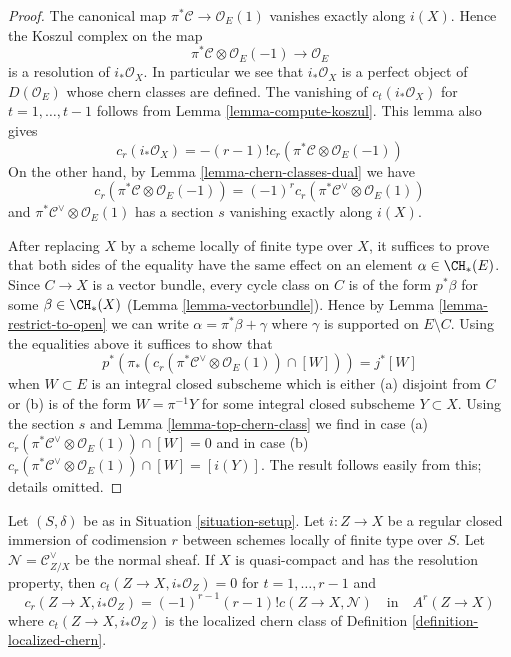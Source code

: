 \begin{proof}
The canonical map $\pi^*\mathcal{C} \to \mathcal{O}_E(1)$ vanishes
exactly along $i(X)$. Hence the Koszul complex on the map
$$
\pi^*\mathcal{C} \otimes \mathcal{O}_E(-1) \to \mathcal{O}_E
$$
is a resolution of $i_*\mathcal{O}_X$. In particular we see that
$i_*\mathcal{O}_X$ is a perfect object of $D(\mathcal{O}_E)$
whose chern classes are defined. The vanishing of $c_t(i_*\mathcal{O}_X)$
for $t = 1, \ldots, t - 1$ follows from Lemma \ref{lemma-compute-koszul}.
This lemma also gives
$$
c_r(i_*\mathcal{O}_X) = - (r - 1)!
c_r(\pi^*\mathcal{C} \otimes \mathcal{O}_E(-1))
$$
On the other hand, by Lemma \ref{lemma-chern-classes-dual} we have
$$
c_r(\pi^*\mathcal{C} \otimes \mathcal{O}_E(-1)) =
(-1)^r c_r(\pi^*\mathcal{C}^\vee \otimes \mathcal{O}_E(1))
$$
and $\pi^*\mathcal{C}^\vee \otimes \mathcal{O}_E(1)$ has a section $s$
vanishing exactly along $i(X)$.

\medskip\noindent
After replacing $X$ by a scheme locally of finite type over $X$,
it suffices to prove that both sides of the equality have the
same effect on an element $\alpha \in \CH_*(E)$. Since $C \to X$
is a vector bundle, every cycle class on $C$ is of the form $p^*\beta$
for some $\beta \in \CH_*(X)$ (Lemma \ref{lemma-vectorbundle}).
Hence by Lemma \ref{lemma-restrict-to-open}
we can write $\alpha = \pi^*\beta + \gamma$ where $\gamma$
is supported on $E \setminus C$. Using the equalities above
it suffices to show that
$$
p^*(\pi_*(c_r(\pi^*\mathcal{C}^\vee \otimes \mathcal{O}_E(1)) \cap [W])) =
j^*[W]
$$
when $W \subset E$ is an integral closed subscheme which
is either (a) disjoint from $C$ or (b) is of the form $W = \pi^{-1}Y$
for some integral closed subscheme $Y \subset X$.
Using the section $s$ and Lemma \ref{lemma-top-chern-class} we find
in case (a) $c_r(\pi^*\mathcal{C}^\vee \otimes \mathcal{O}_E(1)) \cap [W] = 0$
and in case (b)
$c_r(\pi^*\mathcal{C}^\vee \otimes \mathcal{O}_E(1)) \cap [W] = [i(Y)]$.
The result follows easily from this; details omitted.
\end{proof}

\begin{lemma}
\label{lemma-agreement-with-loc-chern}
Let $(S, \delta)$ be as in Situation \ref{situation-setup}. Let $i : Z \to X$
be a regular closed immersion of codimension $r$
between schemes locally of finite type over $S$.
Let $\mathcal{N} = \mathcal{C}_{Z/X}^\vee$ be the normal sheaf. If $X$
is quasi-compact and has the resolution property, then
$c_t(Z \to X, i_*\mathcal{O}_Z) = 0$ for $t = 1, \ldots, r - 1$ and
$$
c_r(Z \to X, i_*\mathcal{O}_Z) = (-1)^{r - 1} (r - 1)! c(Z \to X, \mathcal{N})
\quad\text{in}\quad
A^r(Z \to X)
$$
where $c_t(Z \to X, i_*\mathcal{O}_Z)$
is the localized chern class
of Definition \ref{definition-localized-chern}.
\end{lemma}

